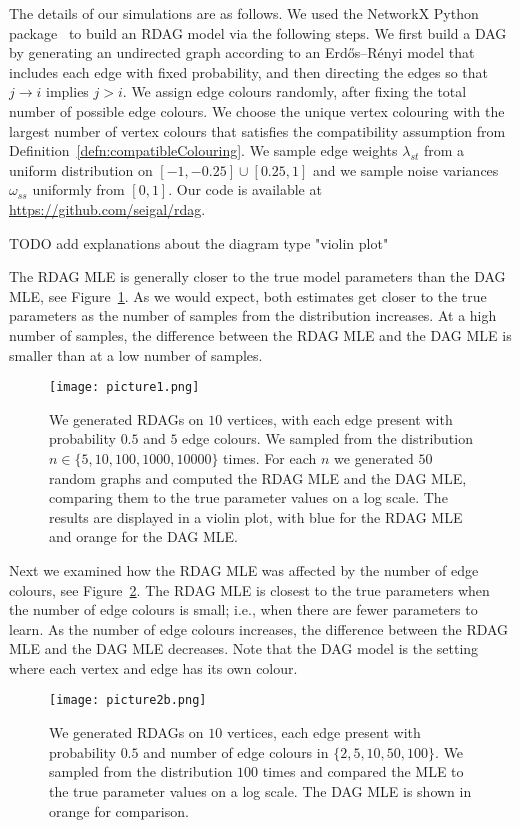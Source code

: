 The details of our simulations are as follows.
We used the NetworkX Python package~\cite{hagberg2008exploring} to build an RDAG model via the following steps.
We first build a DAG by generating an undirected graph according to an Erdős–Rényi model that includes each edge with fixed probability, and then directing the edges so that $j \to i$ implies $j > i$. We assign edge colours randomly, after fixing the total number of possible edge colours. We choose the unique vertex colouring with the largest number of vertex colours that satisfies the compatibility assumption from Definition~\ref{defn:compatibleColouring}. We sample edge weights $\lambda_{st}$ from a uniform distribution on $[-1, -0.25] \cup [0.25, 1]$ and we sample noise variances $\omega_{ss}$ uniformly from $[0,1]$. Our code is available at \url{https://github.com/seigal/rdag}.

TODO add explanations about the diagram type "violin plot"


The RDAG MLE is generally closer to the true model parameters than the DAG MLE, see Figure~\ref{fig:1}. As we would expect, both estimates get closer to the true parameters as the number of samples from the distribution increases. At a high number of samples, the difference between the RDAG MLE and the DAG MLE is smaller than at a low number of samples.

\begin{figure}[ht]
	\centering
	\texttt{[image: picture1.png]}
	\caption{\cite[Figure~1]{RDAG} We generated RDAGs on $10$ vertices, with each edge present with probability $0.5$ and $5$ edge colours. We sampled from the distribution $n \in \{ 5, 10, 100, 1000, 10000 \}$ times. For each $n$ we generated $50$ random graphs and computed the RDAG MLE and the DAG MLE, comparing them to the true parameter values on a log scale. The results are displayed in a violin plot, with blue for the RDAG MLE and orange for the DAG MLE.}
	\label{fig:1}
\end{figure}

Next we examined how the RDAG MLE was affected by the number of edge colours, see Figure~\ref{fig:2}. The RDAG MLE is closest to the true parameters when the number of edge colours is small; i.e., when there are fewer parameters to learn. As the number of edge colours increases, the difference between the RDAG MLE and the DAG MLE decreases. Note that the DAG model is the setting where each vertex and edge has its own colour.

\begin{figure}[ht]
	\centering
	\texttt{[image: picture2b.png]}
	\caption{\cite[Figure~2]{RDAG} We generated RDAGs on $10$ vertices, each edge present with probability $0.5$ and number of edge colours in $\{ 2, 5, 10, 50, 100 \}$. We sampled from the distribution $100$ times and compared the MLE to the true parameter values on a log scale. The DAG MLE is shown in orange for comparison.}
	\label{fig:2}
\end{figure}

